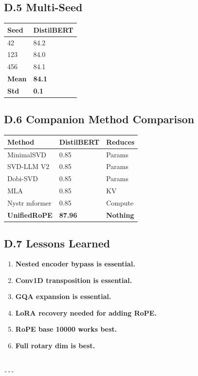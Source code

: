 \subsection{D.5 Multi-Seed}

\begin{table}[H]
\centering
\small
\begin{tabular}{ll}
\toprule
\textbf{Seed} & \textbf{DistilBERT} \\
\midrule
42 & 84.2 \\
123 & 84.0 \\
456 & 84.1 \\
\textbf{Mean} & \textbf{84.1} \\
\textbf{Std} & \textbf{0.1} \\
\bottomrule
\end{tabular}
\end{table}

\subsection{D.6 Companion Method Comparison}

\begin{table}[H]
\centering
\small
\begin{tabular}{lll}
\toprule
\textbf{Method} & \textbf{DistilBERT} & \textbf{Reduces} \\
\midrule
MinimalSVD & 0.85 & Params \\
SVD-LLM V2 & 0.85 & Params \\
Dobi-SVD & 0.85 & Params \\
MLA & 0.85 & KV \\
Nystr mformer & 0.85 & Compute \\
\textbf{UnifiedRoPE} & \textbf{87.96} & \textbf{Nothing} \\
\bottomrule
\end{tabular}
\end{table}

\subsection{D.7 Lessons Learned}

\begin{enumerate}
\item \textbf{Nested encoder bypass is essential.}
\item \textbf{Conv1D transposition is essential.}
\item \textbf{GQA expansion is essential.}
\item \textbf{LoRA recovery needed for adding RoPE.}
\item \textbf{RoPE base 10000 works best.}
\item \textbf{Full rotary dim is best.}
\end{enumerate}
\begin{lstlisting}

---
\end{lstlisting}

